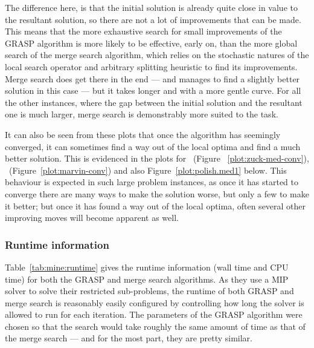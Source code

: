 \documentclass[journal]{IEEEtran}
\begin{document}
The difference here, is that the initial solution is already quite close in value to the resultant solution, so there are not a lot of improvements that can be made. This means that the more exhaustive search for small improvements of the GRASP algorithm is more likely to be effective, early on, than the more global search of the merge search algorithm, which relies on the stochastic natures of the local search operator and arbitrary splitting heuristic to find its improvements. Merge search does get there in the end --- and manages to find a slightly better solution in this case --- but it takes longer and with a more gentle curve. For all the other instances, where the gap between the initial solution and the resultant one is much larger, merge search is demonstrably more suited to the task.

It can also be seen from these plots that once the algorithm has seemingly converged, it can sometimes find a way out of the local optima and find a much better solution. This is evidenced in the plots for \zuckmed{}~(Figure ~\ref{plot:zuck-med-conv}), \marvin{}~(Figure~\ref{plot:marvin-conv}) and also Figure~\ref{plot:polish.med1} below. This behaviour is expected in such large problem instances, as once it has started to converge there are many ways to make the solution worse, but only a few to make it better; but once it has found a way out of the local optima, often several other improving moves will become apparent as well.

\subsubsection*{Runtime information}

Table~\ref{tab:mine:runtime} gives the runtime information (wall time and CPU time) for both the GRASP and merge search algorithms. As they use a MIP solver to solve their restricted sub-problems, the runtime of both GRASP and merge search is reasonably easily configured by controlling how long the solver is allowed to run for each iteration. The parameters of the GRASP algorithm were chosen so that the search would take roughly the same amount of time as that of the merge search --- and for the most part, they are pretty similar. 
\end{document}
